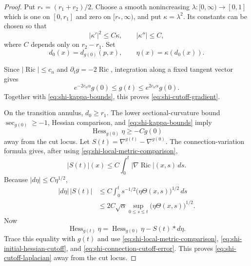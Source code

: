 \documentclass[10pt]{coll-l}
\theoremstyle{definition}
\theoremstyle{remark}
\numberwithin{section}{chapter}
\numberwithin{equation}{chapter}
\newcommand{\Ric}{\operatorname{Ric}}
\begin{document}
\begin{proof}
Put $r_*=(r_1+r_2)/2$.  Choose a smooth nonincreasing
$\lambda:[0,\infty)\to[0,1]$ which is one on $[0,r_1]$ and zero on
$[r_*,\infty)$, and put $\kappa=\lambda^2$.  Its
constants can be chosen so that
\begin{equation}
       |\kappa'|^2\leq C\kappa,
       \qquad |\kappa''|\leq C,                           \label{eq:shi-kappa-bounds}
\end{equation}
where $C$ depends only on $r_2-r_1$.  Set
\[
              d_0(x)=d_{g(0)}(p,x),
              \qquad\eta(x)=\kappa(d_0(x)).
\]

Since $|\Ric|\leq c_n$ and $\partial_tg=-2\Ric$, integration along a fixed
tangent vector gives
\begin{equation}
 e^{-2c_n\alpha}g(0)\leq g(t)\leq e^{2c_n\alpha}g(0).     \label{eq:shi-local-metric-comparison}
\end{equation}
Together with \eqref{eq:shi-kappa-bounds}, this proves
\eqref{eq:shi-cutoff-gradient}.

On the transition annulus, $d_0\geq r_1$.  The lower sectional-curvature
bound $\sec_{g(0)}\geq-1$, Hessian comparison, and
\eqref{eq:shi-kappa-bounds} imply
\begin{equation}
                  \operatorname{Hess}_{g(0)}\eta
                       \geq-Cg(0)                         \label{eq:shi-initial-hessian-cutoff}
\end{equation}
away from the cut locus.  Let
$S(t)=\nabla^{g(t)}-\nabla^{g(0)}$.  The connection-variation formula gives,
after using \eqref{eq:shi-local-metric-comparison},
\begin{equation}
 |S(t)|(x)\leq C\int_0^t|\nabla\Ric|(x,s)\,ds.           \label{eq:shi-connection-difference}
\end{equation}
Because $|d\eta|\leq C\eta^{1/2}$,
\begin{align}
 |d\eta|\,|S(t)|
  &\leq C\int_0^t
       s^{-1/2}\bigl(\eta\Theta(x,s)\bigr)^{1/2}\,ds \\
  &\leq2C\sqrt\alpha
       \sup_{0\leq s\leq t}
          \bigl(\eta\Theta(x,s)\bigr)^{1/2}.             \label{eq:shi-connection-cutoff-error}
\end{align}
Now
\[
 \operatorname{Hess}_{g(t)}\eta
   =\operatorname{Hess}_{g(0)}\eta-S(t)*d\eta.
\]
Trace this equality with $g(t)$ and use
\eqref{eq:shi-local-metric-comparison},
\eqref{eq:shi-initial-hessian-cutoff}, and
\eqref{eq:shi-connection-cutoff-error}.  This proves
\eqref{eq:shi-cutoff-laplacian} away from the cut locus.


\end{proof}
\end{document}
